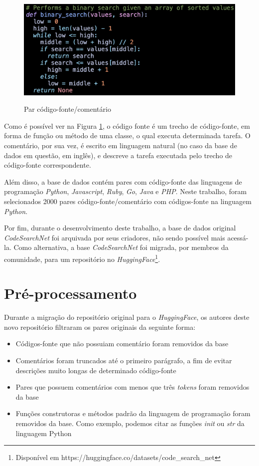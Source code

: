 \begin{figure}[H]
    \centering
        \caption{Par código-fonte/comentário}
        \includegraphics[scale=0.3]{code-comment-pair.png}
        \label{fig:metodology-code-comment-pair}
\end{figure}

Como é possível ver na Figura \ref{fig:metodology-code-comment-pair}, o código fonte é um trecho de código-fonte, em forma de função ou método de uma classe, o qual executa determinada tarefa. O comentário, por sua vez, é escrito em linguagem natural (no caso da base de dados em questão, em inglês), e descreve a tarefa executada pelo trecho de código-fonte correspondente.

Além disso, a base de dados contém pares com código-fonte das linguagens de programação \textit{Python}, \textit{Javascript}, \textit{Ruby}, \textit{Go}, \textit{Java} e \textit{PHP}. Neste trabalho, foram selecionados 2000 pares código-fonte/comentário com códigos-fonte na linguagem \textit{Python}.

Por fim, durante o desenvolvimento deste trabalho, a base de dados original \textit{CodeSearchNet} foi arquivada por seus criadores, não sendo possível mais acessá-la. Como alternativa, a base \textit{CodeSearchNet} foi migrada, por membros da comunidade, para um repositório no \textit{HuggingFace}\footnote{Disponível em https://huggingface.co/datasets/code\_search\_net}.


\section{Pré-processamento}
\label{sec:methodology:pre-processing}

Durante a migração do repositório original para o \textit{HuggingFace}, os autores deste novo repositório filtraram os pares originais da seguinte forma:
\begin{itemize}
    \item Códigos-fonte que não possuiam comentário foram removidos da base
    \item Comentários foram truncados até o primeiro parágrafo, a fim de evitar descrições muito longas de determinado código-fonte
    \item Pares que possuem comentários com menos que três \textit{tokens} foram removidos da base
    \item Funções construtoras e métodos padrão da linguagem de programação foram removidos da base. Como exemplo, podemos citar as funções \textit{init} ou \textit{str} da linguagem Python
\end{itemize}

